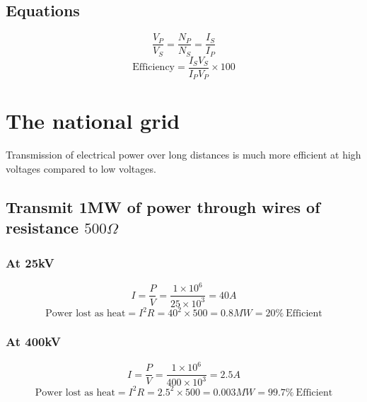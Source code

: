 \documentclass{article}[18pt]
\begin{document}
\subsection{Equations}
$$\frac{V_P}{V_S}=\frac{N_P}{N_S}=\frac{I_S}{I_P}$$
$$\textrm{Efficiency}=\frac{I_SV_S}{I_PV_P}\times100$$
\newpage
\section{The national grid}
Transmission of electrical power over long distances is much more efficient at high voltages compared to low voltages.
\subsection{Transmit 1MW of power through wires of resistance $500\Omega$}
\subsubsection{At 25kV}
$$I=\frac{P}{V}=\frac{1\times10^6}{25\times10^3}=40A$$
$$\textrm{Power lost as heat}=I^2R=40^2\times500=0.8MW=20\%  \ \textrm{Efficient}$$
\subsubsection{At 400kV}
$$I=\frac{P}{V}=\frac{1\times10^6}{400\times10^3}=2.5A$$
$$\textrm{Power lost as heat}=I^2R=2.5^2\times500=0.003MW=99.7\%  \ \textrm{Efficient}$$
\end{document}
